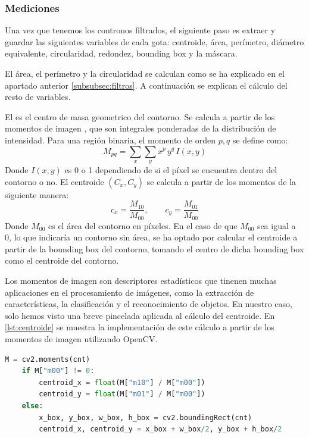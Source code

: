 \subsubsection{Mediciones}

Una vez que tenemos los contronos filtrados, el siguiente paso es extraer y guardar las siguientes variables de cada gota: centroide, área, perímetro, diámetro equivalente, circularidad, redondez, bounding box y la máscara.

El área, el perímetro y la circularidad se calculan como se ha explicado en el apartado anterior \ref{subsubsec:filtros}. A continuación se explican el cálculo del resto de variables.

El  es el centro de masa geometrico del contorno. Se calcula a partir de los momentos de imagen \cite{1057692HU}\cite{bradski2008learning}, que son integrales ponderadas de la distribución de intensidad. Para una región binaria, el momento de orden $p, q$ se define como:
\begin{equation}
    M_{pq} = \sum_{x} \sum_{y} x^p \, y^q \, I(x,y)
\end{equation}
Donde $I(x,y)$ es 0 o 1 dependiendo de si el píxel se encuentra dentro del contorno o no. El centroide $(C_x, C_y)$ se calcula a partir de los momentos de la siguiente manera:
\begin{equation}
    c_x = \frac{M_{10}}{M_{00}}, \qquad c_y = \frac{M_{01}}{M_{00}}
\end{equation}
Donde $M_{00}$ es el área del contorno en píxeles. En el caso de que $M_{00}$ sea igual a 0, lo que indicaría un contorno sin área, se ha optado por calcular el centroide a partir de la bounding box del contorno, tomando el centro de dicha bounding box como el centroide del contorno.

Los momentos de imagen son descriptores estadísticos que tinenen muchas aplicaciones en el procesamiento de imágenes, como la extracción de características, la clasificación y el reconocimiento de objetos. En nuestro caso, solo hemos visto una breve pincelada aplicada al cálculo del centroide. En \ref{lst:centroide} se muestra la implementación de este cálculo a partir de los momentos de imagen utilizando OpenCV.

\begin{lstlisting}[language=Python, caption={Cálculo del centroide a partir de los momentos de imagen.}, label={lst:centroide}]
    M = cv2.moments(cnt)
    if M["m00"] != 0:
        centroid_x = float(M["m10"] / M["m00"])
        centroid_y = float(M["m01"] / M["m00"])
    else:
        x_box, y_box, w_box, h_box = cv2.boundingRect(cnt)
        centroid_x, centroid_y = x_box + w_box/2, y_box + h_box/2
\end{lstlisting}

